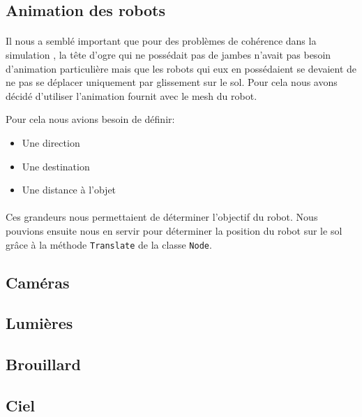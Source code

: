 \subsection{Animation des robots}

\paragraph{}
Il nous a semblé important que pour des problèmes de cohérence dans la
simulation , la tête d'ogre qui ne possédait pas de jambes n'avait pas besoin
d'animation particulière mais que les robots qui eux en possédaient se devaient de
ne pas se déplacer uniquement par glissement sur le sol. Pour cela nous avons
décidé d'utiliser l'animation fournit avec le mesh du robot. 

Pour cela nous avions besoin de définir:\\
\begin{itemize}
  \item Une direction
  \item Une destination
  \item Une distance à l'objet
\end{itemize}

\paragraph{}
Ces grandeurs nous permettaient de déterminer l'objectif du robot. Nous pouvions
ensuite nous en servir pour déterminer la position du robot sur le sol grâce à
la méthode \verb!Translate! de la classe \verb!Node!.

\subsection{Caméras}
\subsection{Lumières}


\subsection{Brouillard}
\subsection{Ciel}
